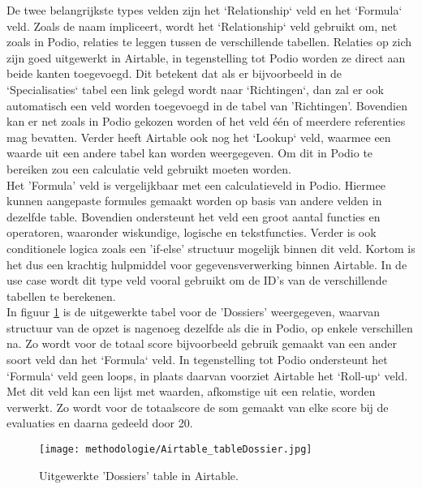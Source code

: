 De twee belangrijkste types velden zijn het `Relationship` veld en het `Formula` veld. Zoals de naam impliceert, wordt het `Relationship` veld gebruikt om, net zoals in Podio, relaties te leggen tussen de verschillende tabellen. Relaties op zich zijn goed uitgewerkt in Airtable, in tegenstelling tot Podio worden ze direct aan beide kanten toegevoegd. Dit betekent dat als er bijvoorbeeld in de `Specialisaties` tabel een link gelegd wordt naar `Richtingen`, dan zal er ook automatisch een veld worden toegevoegd in de tabel van 'Richtingen'. Bovendien kan er net zoals in Podio gekozen worden of het veld één of meerdere referenties mag bevatten. Verder heeft Airtable ook nog het `Lookup` veld, waarmee een waarde uit een andere tabel kan worden weergegeven. Om dit in Podio te bereiken zou een calculatie veld gebruikt moeten worden. \\

Het 'Formula' veld is vergelijkbaar met een calculatieveld in Podio. Hiermee kunnen aangepaste formules gemaakt worden op basis van andere velden in dezelfde table. Bovendien ondersteunt het veld een groot aantal functies en operatoren, waaronder wiskundige, logische en tekstfuncties. Verder is ook conditionele logica zoals een 'if-else' structuur mogelijk binnen dit veld. Kortom is het dus een krachtig hulpmiddel voor gegevensverwerking binnen Airtable.  In de use case wordt dit type veld vooral gebruikt om de ID's van de verschillende tabellen te berekenen. \\

In figuur \ref{fig:meth_airtable_dossiersTable} is de uitgewerkte tabel voor de 'Dossiers' weergegeven, waarvan structuur van de opzet is nagenoeg dezelfde als die in Podio, op enkele verschillen na. Zo wordt voor de totaal score bijvoorbeeld gebruik gemaakt van een ander soort veld dan het `Formula` veld. In tegenstelling tot Podio ondersteunt het `Formula` veld geen loops, in plaats daarvan voorziet Airtable het `Roll-up` veld. Met dit veld kan een lijst met waarden, afkomstige uit een relatie, worden verwerkt. Zo wordt voor de totaalscore de som gemaakt van elke score bij de evaluaties en daarna gedeeld door 20. \\ 

\begin{figure}[h]
    \centering
    \texttt{[image: methodologie/Airtable\_tableDossier.jpg]}
    \caption{Uitgewerkte 'Dossiers' table in Airtable.}
    \label{fig:meth_airtable_dossiersTable}
\end{figure}


